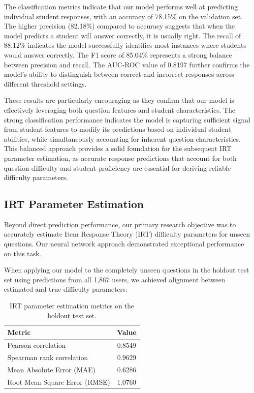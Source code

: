 \documentclass[11pt]{article}
\begin{document}
The classification metrics indicate that our model performs well at predicting individual student responses, with an accuracy of 78.15\% on the validation set. The higher precision (82.18\%) compared to accuracy suggests that when the model predicts a student will answer correctly, it is usually right. The recall of 88.12\% indicates the model successfully identifies most instances where students would answer correctly. The F1 score of 85.04\% represents a strong balance between precision and recall. The AUC-ROC value of 0.8197 further confirms the model's ability to distinguish between correct and incorrect responses across different threshold settings.

These results are particularly encouraging as they confirm that our model is effectively leveraging both question features and student characteristics. The strong classification performance indicates the model is capturing sufficient signal from student features to modify its predictions based on individual student abilities, while simultaneously accounting for inherent question characteristics. This balanced approach provides a solid foundation for the subsequent IRT parameter estimation, as accurate response predictions that account for both question difficulty and student proficiency are essential for deriving reliable difficulty parameters.

\subsection{IRT Parameter Estimation}

Beyond direct prediction performance, our primary research objective was to accurately estimate Item Response Theory (IRT) difficulty parameters for unseen questions. Our neural network approach demonstrated exceptional performance on this task.

When applying our model to the completely unseen questions in the holdout test set using predictions from all 1,867 users, we achieved alignment between estimated and true difficulty parameters:

\begin{table}[!ht] %
    \centering
  \begin{tabular}{lc}
        \toprule %
        \textbf{Metric} & \textbf{Value} \\
        \midrule %
        Pearson correlation & 0.8549 \\
        Spearman rank correlation & 0.9629 \\
        Mean Absolute Error (MAE) & 0.6286 \\
        Root Mean Square Error (RMSE) & 1.0760 \\
        \bottomrule %
  \end{tabular}
    \caption{IRT parameter estimation metrics on the holdout test set.}
    \label{tab:irt-metrics}
\end{table}
\end{document}
